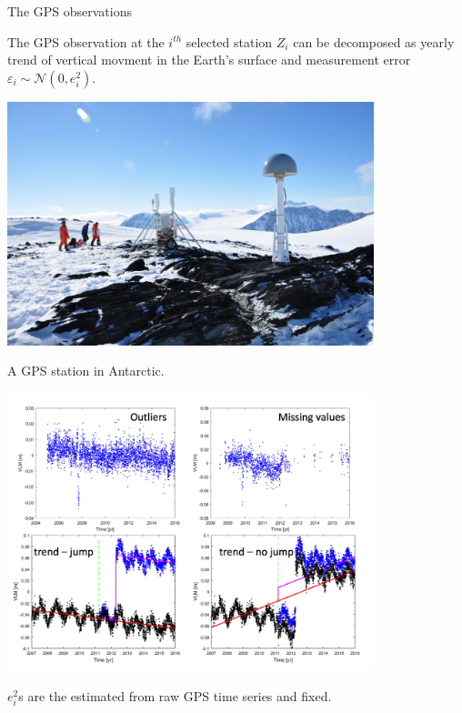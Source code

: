 \documentclass{beamer}
\begin{document}
\begin{frame}{The GPS observations}

The GPS observation at the $i^{th}$ selected station $Z_i$ can be decomposed as yearly trend of vertical movment in the Earth's surface and measurement error $\varepsilon_i \sim \mathcal{N}(0, e_i^2) $.

\begin{minipage}[c]{0.4\textwidth}
\centering
\includegraphics[width=0.8\textwidth]{images/GPSstation}

\tiny{A GPS station in Antarctic.}
\end{minipage}%
\hfill
\begin{minipage}[c]{0.6\textwidth}
\centering
\includegraphics[width=0.8\textwidth]{images/GPSts}
\end{minipage}

$e_i^2$s  are the estimated from raw GPS time series and fixed. 
\end{frame}
\end{document}
